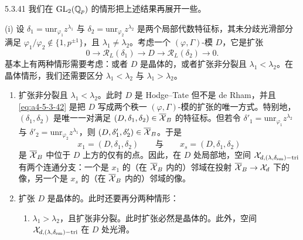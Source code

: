 \begin{exam}{5.3.41}\label{thm:a4-5-3-41}
我们在 $\mathrm{GL}_2(\mathbb{Q}_p)$ 的情形把上述结果再展开一些。

(i) 设 $\delta_1=\mathrm{unr}_{\varphi_1}z^{\lambda_1}$ 与 $\delta_2=\mathrm{unr}_{\varphi_2}z^{\lambda_2}$ 是两个局部代数特征标，其未分歧光滑部分满足 $\varphi_1/\varphi_2\notin\{1,p^{\pm1}\}$，且 $\lambda_1\neq\lambda_2$。考虑一个 $(\varphi,\Gamma)$-模 $D$，它是扩张
\begin{equation}\tag{5.3.42}\label{eq:a4-5-3-42}
0\longrightarrow\mathcal{R}_L(\delta_1)\longrightarrow D\longrightarrow\mathcal{R}_L(\delta_2)\longrightarrow0.
\end{equation}
基本上有两种情形需要考虑：或者 $D$ 是晶体的，或者扩张非分裂且 $\lambda_1<\lambda_2$。在晶体情形，我们还需要区分 $\lambda_1<\lambda_2$ 与 $\lambda_1>\lambda_2$。
\begin{enumerate}[label=(\alph*),leftmargin=2.2em,itemsep=0.15em]
\item 扩张非分裂且 $\lambda_1<\lambda_2$。此时 $D$ 是 Hodge--Tate 但不是 de Rham，并且 \eqref{eq:a4-5-3-42} 是把 $D$ 写成两个秩一 $(\varphi,\Gamma)$-模的扩张的唯一方式。特别地，$(\delta_1,\delta_2)$ 是唯一一对满足 $(D,\delta_1,\delta_2)\in\overline{\mathcal{X}}_B$ 的特征标。但若令 $\delta'_1=\mathrm{unr}_{\varphi_1}z^{\lambda_2}$ 与 $\delta'_2=\mathrm{unr}_{\varphi_2}z^{\lambda_1}$，则 $(D,\delta'_1,\delta'_2)\in\overline{\mathcal{X}}_B$。于是
\[
x_1=(D,\delta_1,\delta_2)\qquad\text{与}\qquad x_s=(D,\delta_1,\delta_2)
\]
是 $\overline{\mathcal{X}}_B$ 中位于 $D$ 上方的仅有的点。因此，在 $D$ 处局部地，空间 $\mathcal{X}_{d,(\lambda,\delta_{\mathrm{sm}})-\mathrm{tri}}$ 有两个连通分支：一个是 $x_1$ 的（在 $\overline{\mathcal{X}}_B$ 内的）邻域在投射 $\overline{\mathcal{X}}_B\to\mathcal{X}_d$ 下的像，另一个是 $x_s$ 的（在 $\overline{\mathcal{X}}_B$ 内的）邻域的像。
\item 扩张 $D$ 是晶体的。此时还要再分两种情形：
\begin{enumerate}[label=({b}\arabic*),leftmargin=2.8em,itemsep=0.15em]
\item $\lambda_1>\lambda_2$，且扩张非分裂。此时扩张必然是晶体的。此外，空间 $\mathcal{X}_{d,(\lambda,\delta_{\mathrm{sm}})-\mathrm{tri}}$ 在 $D$ 处光滑。


\end{enumerate}
\end{enumerate}
\end{exam}
